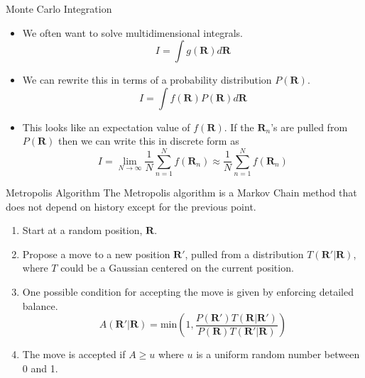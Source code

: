 \documentclass{beamer}
\newcommand{\R}{\mathbf{R}}
\begin{document}
\begin{frame}{Monte Carlo Integration}
\begin{itemize}
   \item We often want to solve multidimensional integrals.
      \begin{equation*}
         I=\int g(\R)d\R
      \end{equation*}
   \item We can rewrite this in terms of a probability distribution $P(\R)$.
      \begin{equation*}
         I=\int f(\R)P(\R)d\R
      \end{equation*}
   \item This looks like an expectation value of $f(\R)$. If the $\R_n$'s are pulled from $P(\R)$ then we can write this in discrete form as
   \begin{equation*}
      I=\lim\limits_{N\rightarrow\infty} \frac{1}{N}\sum\limits_{n=1}^N f(\R_n) \approx \frac{1}{N}\sum\limits_{n=1}^N f(\R_n)
   \end{equation*}
\end{itemize}
\end{frame}

\begin{frame}{Metropolis Algorithm}
   The Metropolis algorithm is a Markov Chain method that does not depend on history except for the previous point.
\begin{enumerate}
   \item Start at a random position, $\R$.
   \item Propose a move to a new position $\R'$, pulled from a distribution $T(\R'|\R)$, where $T$ could be a Gaussian centered on the current position. %
   \item One possible condition for accepting the move is given by enforcing detailed balance.
   \begin{equation*}
      A(\R'|\R) = \mathrm{min}\left(1,\frac{P(\R')T(\R|\R')}{P(\R)T(\R'|\R)}\right)
   \end{equation*}
   \item The move is accepted if $A\ge u$ where $u$ is a uniform random number between 0 and 1.
\end{enumerate}
\end{frame}
\end{document}
